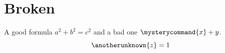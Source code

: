 \documentclass{article}
\begin{document}
\section{Broken}
A good formula $a^2 + b^2 = c^2$ and a bad one $\mysterycommand{x} + y$.
\begin{equation}
  \anotherunknown{z} = 1
\end{equation}
\end{document}
